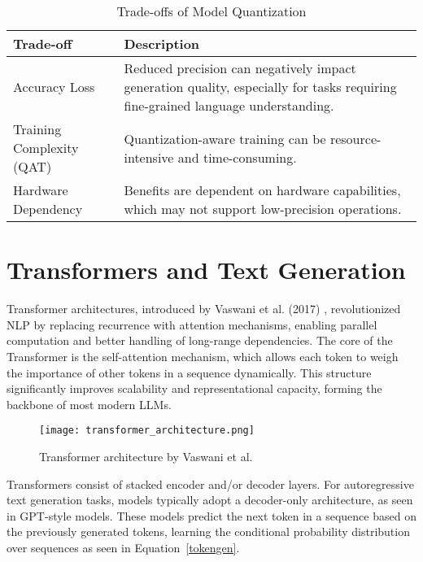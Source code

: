 \begin{table}[H]
  \centering
  \scriptsize
  \renewcommand{\arraystretch}{1.3}
  \begin{tabularx}{0.95\textwidth}{
    >{\raggedright\arraybackslash}p{5cm}
    >{\raggedright\arraybackslash}X
  }
    \toprule
    \textbf{Trade-off} & \textbf{Description} \\
    \midrule
    Accuracy Loss & Reduced precision can negatively impact generation quality, especially for tasks requiring fine-grained language understanding. \\
    Training Complexity (QAT) & Quantization-aware training can be resource-intensive and time-consuming. \\
    Hardware Dependency & Benefits are dependent on hardware capabilities, which may not support low-precision operations. \\
    \bottomrule
  \end{tabularx}
  \caption{Trade-offs of Model Quantization}
\end{table}

\section{Transformers and Text Generation}

Transformer architectures, introduced by Vaswani et al. (2017) \cite{vaswani2017attention}, revolutionized NLP by
replacing recurrence with attention mechanisms, enabling parallel computation and better
handling of long-range dependencies. The core of the Transformer is the self-attention
mechanism, which allows each token to weigh the importance of other tokens in a sequence
dynamically. This structure significantly improves scalability and representational capacity,
forming the backbone of most modern LLMs.

\begin{figure}[H]
  \centering
  \texttt{[image: transformer\_architecture.png]}
  \caption{Transformer architecture by Vaswani et al. \cite{vaswani2017attention}}
\end{figure}

Transformers consist of stacked encoder and/or decoder layers. For autoregressive text
generation tasks, models typically adopt a decoder-only architecture, as seen in GPT-style
models. These models predict the next token in a sequence based on the previously
generated tokens, learning the conditional probability distribution over sequences as seen
in Equation~\ref{tokengen}.

